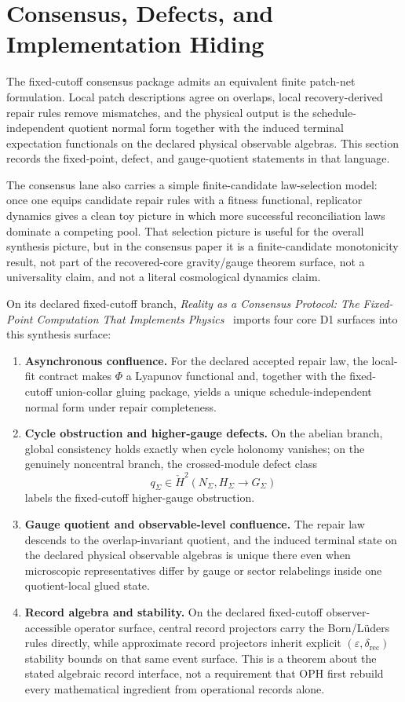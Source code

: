 \section{Consensus, Defects, and Implementation Hiding}

The fixed-cutoff consensus package admits an equivalent finite patch-net formulation. Local patch descriptions agree on
overlaps, local recovery-derived repair rules remove mismatches, and the physical output is the
schedule-independent quotient normal form together with the induced terminal expectation
functionals on the declared physical observable algebras. This section records the fixed-point,
defect, and gauge-quotient statements in that language.

The consensus lane also carries a simple finite-candidate law-selection model: once one equips
candidate repair rules with a fitness functional, replicator dynamics gives a clean toy picture in
which more successful reconciliation laws dominate a competing pool. That selection picture is
useful for the overall synthesis picture, but in the consensus paper it is a finite-candidate
monotonicity result, not part of the recovered-core gravity/gauge theorem surface, not a
universality claim, and not a literal cosmological dynamics claim.

On its declared fixed-cutoff branch, \emph{Reality as a Consensus Protocol: The Fixed-Point
Computation That Implements Physics}~\cite{ophconsensus} imports four core D1 surfaces into this
synthesis surface:
\begin{enumerate}[leftmargin=2em]
\item \textbf{Asynchronous confluence.} For the declared accepted repair law, the local-fit
contract makes \(\Phi\) a Lyapunov functional and, together with the fixed-cutoff union-collar
gluing package, yields a unique schedule-independent normal form under repair completeness.
\item \textbf{Cycle obstruction and higher-gauge defects.} On the abelian branch, global
consistency holds exactly when cycle holonomy vanishes; on the genuinely noncentral branch, the
crossed-module defect class
\[
q_\Sigma \in \check H^2(N_\Sigma,H_\Sigma \to G_\Sigma)
\]
labels the fixed-cutoff higher-gauge obstruction.
\item \textbf{Gauge quotient and observable-level confluence.} The repair law descends to the
overlap-invariant quotient, and the induced terminal state on the declared physical observable
algebras is unique there even when microscopic representatives differ by gauge or sector
relabelings inside one quotient-local glued state.
\item \textbf{Record algebra and stability.} On the declared fixed-cutoff observer-accessible
operator surface, central record projectors carry the Born/L\"uders rules directly, while
approximate record projectors inherit explicit \((\varepsilon,\delta_{\mathrm{rec}})\) stability
bounds on that same event surface. This is a theorem about the stated algebraic record interface,
not a requirement that OPH first rebuild every mathematical ingredient from operational records alone.
\end{enumerate}

